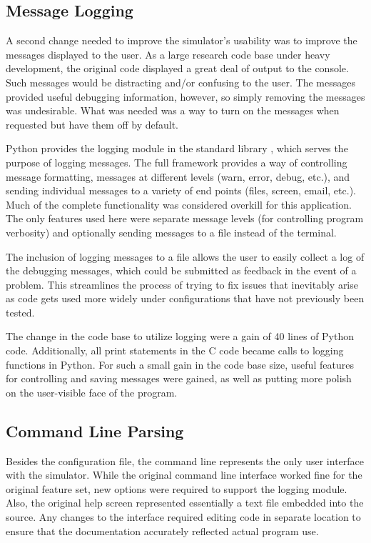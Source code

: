 \documentclass[twocolumn]{article}
\begin{document}
\subsection{Message Logging}
A second change needed to improve the simulator's usability was to improve the
messages displayed to the user.  As a large research code base under heavy
development, the original code displayed a great deal of output to the console.
Such messages would be distracting and/or confusing to the user. The messages
provided useful debugging information, however, so simply removing the messages
was undesirable. What was needed was a way to turn on the messages when
requested but have them off by default.

Python provides the logging module in the standard library \cite{logging}, which
serves the purpose of logging messages. The full framework provides a way of
controlling message formatting, messages at different levels (warn, error,
debug, etc.), and sending individual messages to a variety of end points (files,
screen, email, etc.). Much of the complete functionality was considered overkill
for this application. The only features used here were separate message levels
(for controlling program verbosity) and optionally sending messages to a file
instead of the terminal.

The inclusion of logging messages to a file allows the user to easily collect
a log of the debugging messages, which could be submitted as feedback in the
event of a problem. This streamlines the process of trying to fix issues that
inevitably arise as code gets used more widely under configurations that have
not previously been tested.

The change in the code base to utilize logging were a gain of 40 lines of Python
code. Additionally, all print statements in the C code became calls to logging
functions in Python. For such a small gain in the code base size, useful
features for controlling and saving messages were gained, as well as putting
more polish on the user-visible face of the program.

\subsection{Command Line Parsing}
Besides the configuration file, the command line represents the only user
interface with the simulator. While the original command line interface worked
fine for the original feature set, new options were required to support the
logging module. Also, the original help screen represented essentially a text
file embedded into the source. Any changes to the interface required editing
code in separate location to ensure that the documentation accurately
reflected actual program use.
\end{document}
